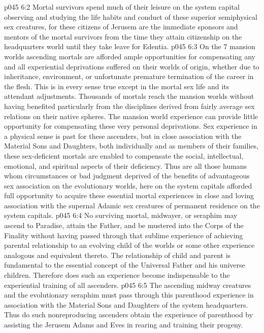\vs p045 6:2 Mortal survivors spend much of their leisure on the system capital observing and studying the life habits and conduct of these superior semiphysical sex creatures, for these citizens of Jerusem are the immediate sponsors and mentors of the mortal survivors from the time they attain citizenship on the headquarters world until they take leave for Edentia.
\vs p045 6:3 On the 7 mansion worlds ascending mortals are afforded ample opportunities for compensating any and all experiential deprivations suffered on their worlds of origin, whether due to inheritance, environment, or unfortunate premature termination of the career in the flesh. This is in every sense true except in the mortal sex life and its attendant adjustments. Thousands of mortals reach the mansion worlds without having benefited particularly from the disciplines derived from fairly average sex relations on their native spheres. The mansion world experience can provide little opportunity for compensating these very personal deprivations. Sex experience in a physical sense is past for these ascenders, but in close association with the Material Sons and Daughters, both individually and as members of their families, these sex\hyp{}deficient mortals are enabled to compensate the social, intellectual, emotional, and spiritual aspects of their deficiency. Thus are all those humans whom circumstances or bad judgment deprived of the benefits of advantageous sex association on the evolutionary worlds, here on the system capitals afforded full opportunity to acquire these essential mortal experiences in close and loving association with the supernal Adamic sex creatures of permanent residence on the system capitals.
\vs p045 6:4 \pc No surviving mortal, midwayer, or seraphim may ascend to Paradise, attain the Father, and be mustered into the Corps of the Finality without having passed through that sublime experience of achieving parental relationship to an evolving child of the worlds or some other experience analogous and equivalent thereto. The relationship of child and parent is fundamental to the essential concept of the Universal Father and his universe children. Therefore does such an experience become indispensable to the experiential training of all ascenders.
\vs p045 6:5 The ascending midway creatures and the evolutionary seraphim must pass through this parenthood experience in association with the Material Sons and Daughters of the system headquarters. Thus do such nonreproducing ascenders obtain the experience of parenthood by assisting the Jerusem Adams and Eves in rearing and training their progeny.
